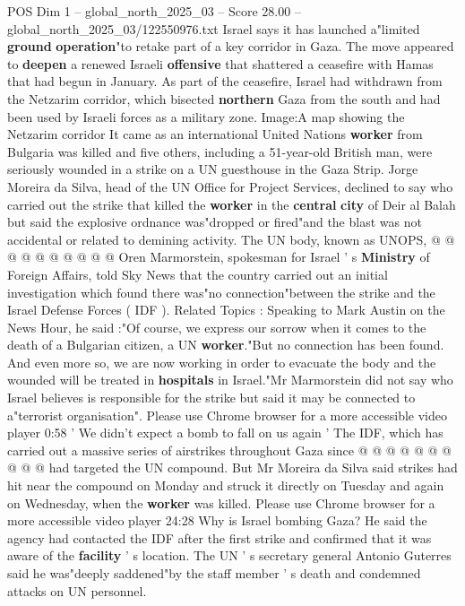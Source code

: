 \begin{textsample}{POS Dim 1 – global\_north\_2025\_03 – Score 28.00 – global\_north\_2025\_03/122550976.txt}  \label{ex:f1_pos_398}
Israel says it has launched a"limited \textbf{ground} \textbf{operation}"to retake part of a key corridor in Gaza.
The move appeared to \textbf{deepen} a renewed Israeli \textbf{offensive} that shattered a ceasefire with Hamas that had begun in January.
As part of the ceasefire, Israel had withdrawn from the Netzarim corridor, which bisected \textbf{northern} Gaza from the south and had been used by Israeli forces as a military zone.
Image:A map showing the Netzarim corridor It came as an international United Nations \textbf{worker} from Bulgaria was killed and five others, including a 51-year-old British man, were seriously wounded in a strike on a UN guesthouse in the Gaza Strip.
Jorge Moreira da Silva, head of the UN Office for Project Services, declined to say who carried out the strike that killed the \textbf{worker} in the \textbf{central} \textbf{city} of Deir al Balah but said the explosive ordnance was"dropped or fired"and the blast was not accidental or related to demining activity.
The UN body, known as UNOPS, @ @ @ @ @ @ @ @ @ @ Oren Marmorstein, spokesman for Israel ' s \textbf{Ministry} of Foreign Affairs, told Sky News that the country carried out an initial investigation which found there was"no connection"between the strike and the Israel Defense Forces ( IDF ).
Related Topics : Speaking to Mark Austin on the News Hour, he said :"Of course, we express our sorrow when it comes to the death of a Bulgarian citizen, a UN \textbf{worker}."But no connection has been found.
And even more so, we are now working in order to evacuate the body and the wounded will be treated in \textbf{hospitals} in Israel."Mr Marmorstein did not say who Israel believes is responsible for the strike but said it may be connected to a"terrorist organisation".
Please use Chrome browser for a more accessible video player 0:58 ' We didn't expect a bomb to fall on us again ' The IDF, which has carried out a massive series of airstrikes throughout Gaza since @ @ @ @ @ @ @ @ @ @ had targeted the UN compound.
But Mr Moreira da Silva said strikes had hit near the compound on Monday and struck it directly on Tuesday and again on Wednesday, when the \textbf{worker} was killed.
Please use Chrome browser for a more accessible video player 24:28 Why is Israel bombing Gaza?
He said the agency had contacted the IDF after the first strike and confirmed that it was aware of the \textbf{facility} ' s location.
The UN ' s secretary general Antonio Guterres said he was"deeply saddened"by the staff member ' s death and condemned attacks on UN personnel.

\end{textsample}
